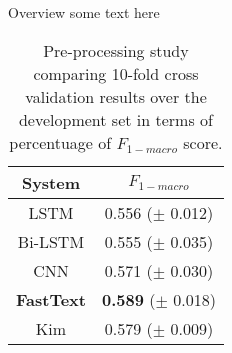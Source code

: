 Overview some text here

\begin{table}[h]
\footnotesize
\caption{Pre-processing study comparing 10-fold cross validation results over the development set in terms of percentuage of $F_{1-macro}$ score. }
\label{tab:overview}
\centering
\begin{tabular}{c|c}
\toprule
\hline
System		& $F_{1-macro}$		\\
\hline
LSTM		& 0.556 ($\pm$ 0.012) \\
Bi-LSTM		& 0.555 ($\pm$ 0.035) \\
CNN			& 0.571 ($\pm$ 0.030) \\
\textbf{FastText}	& \textbf{0.589} ($\pm$ 0.018) \\
Kim			& 0.579 ($\pm$ 0.009) \\
\hline
\bottomrule
\end{tabular}
\end{table}
